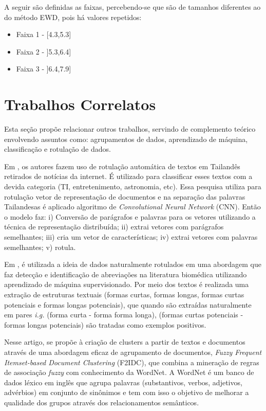 A seguir são definidas as faixas, percebendo-se que são de tamanhos diferentes ao do método EWD, pois há valores repetidos:

\vspace{-3mm}
\begin{itemize}[noitemsep]
 \item Faixa 1 - [4.3,5.3]
 \item Faixa 2 - ]5.3,6.4]
 \item Faixa 3 - ]6.4,7.9]

\end{itemize}


 

\section{Trabalhos Correlatos}\label{cap:refTeor:sec:trabcorrel}

Esta seção propõe relacionar outros trabalhos, servindo de complemento teórico envolvendo assuntos como: agrupamentos de dados, aprendizado de máquina, classificação e rotulação de dados. 

Em \cite{Jirasirilerd2018}, os autores fazem uso de rotulação automática de textos em Tailandês retirados de notícias da internet. É utilizado para classificar esses textos com a devida categoria (TI, entretenimento, astronomia, etc). Essa pesquisa utiliza para rotulação vetor de representação de documentos e na separação das palavras Tailandesas é aplicado algoritmo de \textit{Convolutional Neural Network} (CNN). Então o modelo faz: i) Conversão de parágrafos e palavras para os vetores utilizando a técnica de representação distribuída; ii) extrai vetores com parágrafos semelhantes; iii) cria um vetor de características; iv) extrai vetores com palavras semelhantes; v) rotula.



Em \cite{Yeganova2010}, é utilizada a ideia de dados naturalmente rotulados em uma abordagem que faz detecção e identificação de abreviações na literatura biomédica utilizando aprendizado de máquina supervisionado. Por meio dos textos é realizada uma extração de estruturas textuais (formas curtas, formas longas, formas curtas potenciais e formas longas potenciais), que quando são extraídas naturalmente em pares \textit{i.g.} (forma curta - forma forma longa), (formas curtas potenciais - formas longas potenciais) são tratadas como exemplos positivos. 

Nesse artigo, \cite{Chen2011} se propõe à criação de clusters a partir de textos e documentos através de uma abordagem eficaz de agrupamento de documentos, \textit{Fuzzy Frequent Itemset-based Document Clustering} (F2IDC), que combina a mineração de regras de associação \textit{fuzzy} com conhecimento da WordNet. A WordNet é um banco de dados léxico em inglês que agrupa palavras (substantivos, verbos, adjetivos, advérbios) em conjunto de sinônimos e tem com isso o objetivo de melhorar a qualidade dos grupos através dos relacionamentos semânticos. 
 
